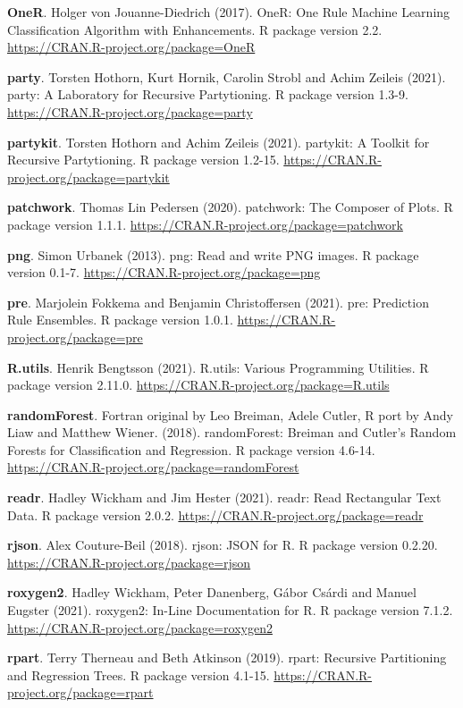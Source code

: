 \documentclass[
  12pt,
]{krantz}
\begin{document}
\textbf{OneR}. Holger von Jouanne-Diedrich (2017). OneR: One Rule Machine Learning Classification Algorithm with
Enhancements. R package version 2.2. \url{https://CRAN.R-project.org/package=OneR}

\textbf{party}. Torsten Hothorn, Kurt Hornik, Carolin Strobl and Achim Zeileis (2021). party: A Laboratory for Recursive Partytioning. R package version 1.3-9. \url{https://CRAN.R-project.org/package=party}

\textbf{partykit}. Torsten Hothorn and Achim Zeileis (2021). partykit: A Toolkit for Recursive Partytioning. R package version 1.2-15. \url{https://CRAN.R-project.org/package=partykit}

\textbf{patchwork}. Thomas Lin Pedersen (2020). patchwork: The Composer of Plots. R package version 1.1.1. \url{https://CRAN.R-project.org/package=patchwork}

\textbf{png}. Simon Urbanek (2013). png: Read and write PNG images. R package version 0.1-7. \url{https://CRAN.R-project.org/package=png}

\textbf{pre}. Marjolein Fokkema and Benjamin Christoffersen (2021). pre: Prediction Rule Ensembles. R package version 1.0.1. \url{https://CRAN.R-project.org/package=pre}

\textbf{R.utils}. Henrik Bengtsson (2021). R.utils: Various Programming Utilities. R package version 2.11.0. \url{https://CRAN.R-project.org/package=R.utils}

\textbf{randomForest}. Fortran original by Leo Breiman, Adele Cutler, R port by Andy Liaw and Matthew Wiener. (2018). randomForest: Breiman and Cutler's Random Forests for Classification and
Regression. R package version 4.6-14. \url{https://CRAN.R-project.org/package=randomForest}

\textbf{readr}. Hadley Wickham and Jim Hester (2021). readr: Read Rectangular Text Data. R package version 2.0.2. \url{https://CRAN.R-project.org/package=readr}

\textbf{rjson}. Alex Couture-Beil (2018). rjson: JSON for R. R package version 0.2.20. \url{https://CRAN.R-project.org/package=rjson}

\textbf{roxygen2}. Hadley Wickham, Peter Danenberg, Gábor Csárdi and Manuel Eugster (2021). roxygen2: In-Line Documentation for R. R package version 7.1.2. \url{https://CRAN.R-project.org/package=roxygen2}

\textbf{rpart}. Terry Therneau and Beth Atkinson (2019). rpart: Recursive Partitioning and Regression Trees. R package version 4.1-15. \url{https://CRAN.R-project.org/package=rpart}
\end{document}
